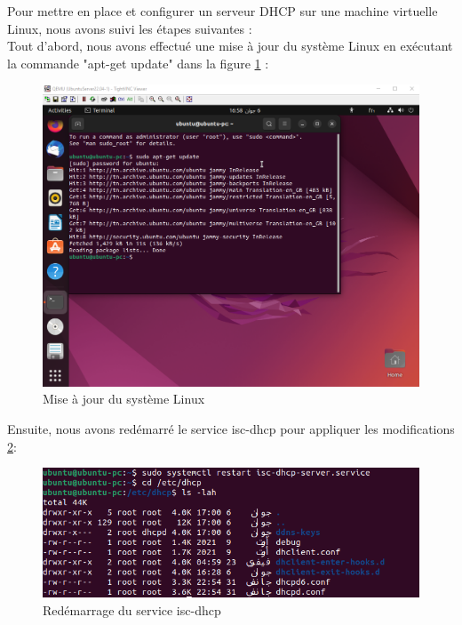 Pour mettre en place et configurer un serveur DHCP sur une machine virtuelle Linux, nous avons suivi les étapes suivantes : \\

Tout d'abord, nous avons effectué une mise à jour du système Linux en exécutant la commande "apt-get update" dans la figure \ref{fig:update-linux} : \\

\begin{figure}[H]
 \centering
    \includegraphics[width=15cm]{Images/dhcp1.png}
    \caption{Mise à jour du système Linux}
    \label{fig:update-linux}
\end{figure}

Ensuite, nous avons redémarré le service isc-dhcp pour appliquer les modifications \ref{fig:restart-isc-dhcp}: \\

\begin{figure}[H]
 \centering
    \includegraphics[width=15cm]{Images/dhcp2.png}
    \caption{Redémarrage du service isc-dhcp}
    \label{fig:restart-isc-dhcp}
\end{figure}

